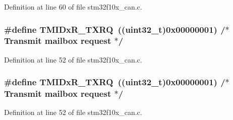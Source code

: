 Definition at line 60 of file stm32f10x\+\_\+can.\+c.

\subsubsection[{\texorpdfstring{T\+M\+I\+Dx\+R\+\_\+\+T\+X\+RQ}{TMIDxR_TXRQ}}]{\setlength{\rightskip}{0pt plus 5cm}\#define T\+M\+I\+Dx\+R\+\_\+\+T\+X\+RQ~(({\bf uint32\+\_\+t})0x00000001) /$\ast$ Transmit mailbox request $\ast$/}\hypertarget{group___c_a_n___private___defines_gabeb6db5ba5c01da5084ec1605f868e18}{}\label{group___c_a_n___private___defines_gabeb6db5ba5c01da5084ec1605f868e18}


Definition at line 52 of file stm32f10x\+\_\+can.\+c.

\subsubsection[{\texorpdfstring{T\+M\+I\+Dx\+R\+\_\+\+T\+X\+RQ}{TMIDxR_TXRQ}}]{\setlength{\rightskip}{0pt plus 5cm}\#define T\+M\+I\+Dx\+R\+\_\+\+T\+X\+RQ~(({\bf uint32\+\_\+t})0x00000001) /$\ast$ Transmit mailbox request $\ast$/}\hypertarget{group___c_a_n___private___defines_gabeb6db5ba5c01da5084ec1605f868e18}{}\label{group___c_a_n___private___defines_gabeb6db5ba5c01da5084ec1605f868e18}


Definition at line 52 of file stm32f10x\+\_\+can.\+c.


